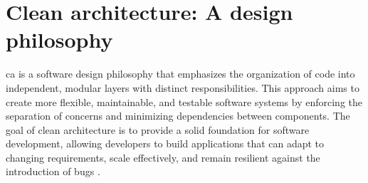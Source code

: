 \section{Clean architecture: A design philosophy}\label{sec_ca_theory}

\gls{ca} is a software design philosophy that emphasizes the organization of code
into independent, modular layers with distinct responsibilities. This approach aims to
create more flexible, maintainable, and testable software systems by enforcing the
separation of concerns and minimizing dependencies between components. The goal of clean
architecture is to provide a solid foundation for software development, allowing
developers to build applications that can adapt to changing requirements, scale
effectively, and remain resilient against the introduction of bugs
\parencite{robert_c_martin_clean_2018}.